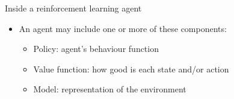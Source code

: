 \bgroup
\begin{frame}{Inside  a reinforcement learning agent}
\begin{itemize}
\item An agent may include one or more of these components:
\begin{itemize}
\item Policy: agent's behaviour function
\item Value function: how good is each state and/or action
\item Model: representation of the environment
\end{itemize}
\end{itemize}
\end{frame}
\egroup